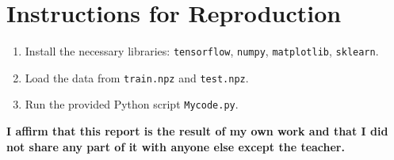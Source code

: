 \documentclass[a4paper,10pt]{article}
\begin{document}
\section{Instructions for Reproduction}
\begin{enumerate}
    \item Install the necessary libraries: \texttt{tensorflow}, \texttt{numpy}, \texttt{matplotlib}, \texttt{sklearn}.
    \item Load the data from \texttt{train.npz} and \texttt{test.npz}.
    \item Run the provided Python script \texttt{Mycode.py}.
\end{enumerate}

\textbf{I affirm that this report is the result of my own work and that I did not share any part of it with anyone else except the teacher.}
\end{document}
